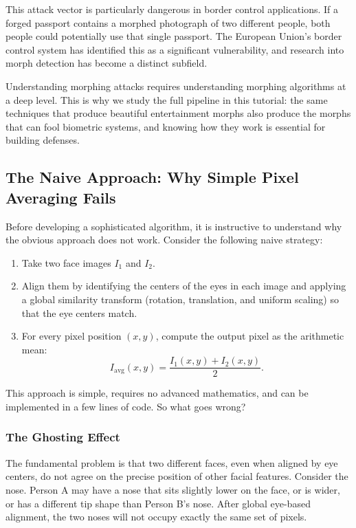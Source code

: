 This attack vector is particularly dangerous in border control applications. If a forged passport
contains a morphed photograph of two different people, both people could potentially use that
single passport. The European Union's border control system has identified this as a significant
vulnerability, and research into morph detection has become a distinct subfield.

Understanding morphing attacks requires understanding morphing algorithms at a deep level. This is
why we study the full pipeline in this tutorial: the same techniques that produce beautiful
entertainment morphs also produce the morphs that can fool biometric systems, and knowing
how they work is essential for building defenses.


\subsection{The Naive Approach: Why Simple Pixel Averaging Fails}

Before developing a sophisticated algorithm, it is instructive to understand why the obvious
approach does not work. Consider the following naive strategy:

\begin{enumerate}
    \item Take two face images $I_1$ and $I_2$.
    \item Align them by identifying the centers of the eyes in each image and applying a global
    similarity transform (rotation, translation, and uniform scaling) so that the eye centers match.
    \item For every pixel position $(x, y)$, compute the output pixel as the arithmetic mean:
    \[
        I_{\text{avg}}(x, y) = \frac{I_1(x, y) + I_2(x, y)}{2}.
    \]
\end{enumerate}

This approach is simple, requires no advanced mathematics, and can be implemented in a few lines
of code. So what goes wrong?

\subsubsection{The Ghosting Effect}

The fundamental problem is that two different faces, even when aligned by eye centers, do not agree
on the precise position of other facial features. Consider the nose. Person A may have a nose that
sits slightly lower on the face, or is wider, or has a different tip shape than Person B's nose.
After global eye-based alignment, the two noses will not occupy exactly the same set of pixels.

